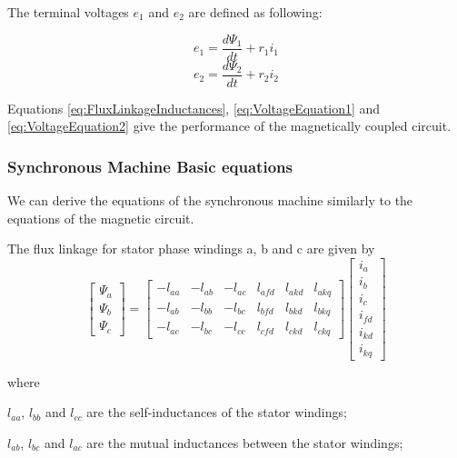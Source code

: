 The terminal voltages $e_1$ and $e_2$ are defined as following:

\begin{equation} \label{eq:VoltageEquation1}
	e_1 = \frac{d \Psi_1}{d t} + r_1 i_1
\end{equation}
\begin{equation} \label{eq:VoltageEquation2}
	e_2 = \frac{d \Psi_2}{d t} + r_2 i_2
\end{equation}

Equations \ref{eq:FluxLinkageInductances}, \ref{eq:VoltageEquation1} and \ref{eq:VoltageEquation2} give the performance of the magnetically coupled circuit.

\subsubsection{Synchronous Machine Basic equations}

We can derive the equations of the synchronous machine similarly to the equations of the magnetic circuit.

The flux linkage for stator phase windings a, b and c are given by
\begin{equation}
	\begin{bmatrix}
		\Psi_a \\
		\Psi_b \\
		\Psi_c
	\end{bmatrix}
	=
	\begin{bmatrix}
		-l_{aa} & -l_{ab} & -l_{ac} & l_{afd} & l_{akd} & l_{akq} \\  
		-l_{ab} & -l_{bb} & -l_{bc} & l_{bfd} & l_{bkd} & l_{bkq} \\  
		-l_{ac} & -l_{bc} & -l_{cc} & l_{cfd} & l_{ckd} & l_{ckq}  
	\end{bmatrix}
	\begin{bmatrix}
		i_a \\
		i_b \\
		i_c \\
		i_{fd} \\
		i_{kd} \\
		i_{kq}
	\end{bmatrix}
\end{equation}

where

$l_{aa}$, $l_{bb}$ and $l_{cc}$ are the self-inductances of the stator windings;

$l_{ab}$, $l_{bc}$ and $l_{ac}$ are the mutual inductances between the stator windings;


